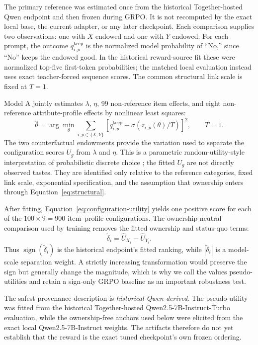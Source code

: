 \documentclass[11pt,letterpaper]{article}
\newcommand{\dd}{\widetilde{\delta}}
\begin{document}
The primary reference was estimated once from the historical Together-hosted
Qwen endpoint and then frozen during GRPO. It is not recomputed by the exact
local base, the current adapter, or any later checkpoint. Each comparison
supplies two observations: one with $X$ endowed
and one with $Y$ endowed. For each prompt, the outcome
$q_{i,p}^{\mathrm{keep}}$ is the normalized model probability of ``No,'' since
``No'' keeps the endowed good. In the historical reward-source fit these were
normalized top-five first-token probabilities; the matched local evaluation
instead uses exact teacher-forced sequence scores. The common structural link
scale is fixed at $T=1$.

Model A jointly estimates $\lambda$, $\eta$, 99 non-reference item effects,
and eight non-reference attribute-profile effects by nonlinear least squares:
\begin{equation}
\widehat\theta
=\arg\min_\theta
\sum_{i,p\in\{X,Y\}}
\left[q_{i,p}^{\mathrm{keep}}-
\sigma\!\left(z_{i,p}(\theta)/T\right)\right]^2,
\qquad T=1.
\label{eq:nls-utility}
\end{equation}
The two counterfactual endowments provide the variation used to separate the
configuration scores $U_g$ from $\lambda$ and $\eta$. This is a parametric
random-utility-style interpretation of probabilistic discrete choice
\citep{mcfadden2000economic,train2009discrete}; the fitted $U_g$ are not
directly observed tastes. They are identified only relative to the reference
categories, fixed link scale, exponential specification, and the assumption
that ownership enters through Equation~\ref{eq:structural}.

After fitting, Equation~\ref{eq:configuration-utility} yields one positive
score for each of the $100\times9=900$ item--profile configurations. The
ownership-neutral comparison used by training removes the fitted ownership and
status-quo terms:
\begin{equation}
\dd_i=\widehat U_{X_i}-\widehat U_{Y_i}.
\label{eq:pseudo-delta}
\end{equation}
Thus $\operatorname{sign}(\dd_i)$ is the historical endpoint's fitted ranking, while
$|\dd_i|$ is a model-scale separation weight. A strictly
increasing transformation would preserve the sign but generally change the
magnitude, which is why we call the values pseudo-utilities and retain a
sign-only GRPO baseline as an important robustness test.

The safest provenance description is \emph{historical-Qwen-derived}. The
pseudo-utility was fitted from the historical
Together-hosted Qwen2.5-7B-Instruct-Turbo evaluation, while the ownership-free
anchors used below were elicited from the exact local Qwen2.5-7B-Instruct
weights. The artifacts therefore do not yet establish that the reward is the
exact tuned checkpoint's own frozen ordering.
\end{document}
